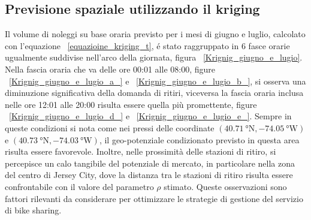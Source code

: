 \subsection{Previsione spaziale utilizzando il kriging}
Il volume di noleggi su base oraria previsto per i mesi di giugno e luglio, calcolato con l'equazione ~\ref{equazioine_kriging_t}, é stato raggruppato in 6 fasce orarie ugualmente suddivise nell'arco della giornata, figura  ~\ref{Krignig_giugno_e_lugio}. Nella fascia oraria che va delle ore 00:01 alle 08:00, figure ~\ref{Krignig_giugno_e_lugio_a_} e ~\ref{Krignig_giugno_e_lugio_b_}, si osserva una diminuzione significativa della domanda di ritiri, viceversa la fascia oraria inclusa nelle ore 12:01 alle 20:00 risulta essere quella più promettente, figure ~\ref{Krignig_giugno_e_lugio_d_} e ~\ref{Krignig_giugno_e_lugio_e_}. Sempre in queste condizioni si nota come nei pressi delle coordinate $(\SI{40.71}{\degree} \text{N}, \SI{-74.05}{\degree} \text{W})$ e $(\SI{40.73}{\degree} \text{N}, \SI{-74.03}{\degree} \text{W})$, il geo-potenziale condizionato previsto in questa area risulta essere favorevole. Inoltre, nelle prossimità delle stazioni di ritiro, si percepisce un calo tangibile del potenziale di mercato, in particolare nella zona del centro di Jersey City, dove la distanza tra le stazioni di ritiro risulta essere confrontabile con il valore del parametro $\rho$ stimato. Queste osservazioni sono fattori rilevanti da considerare per ottimizzare le strategie di gestione del servizio di bike sharing.

